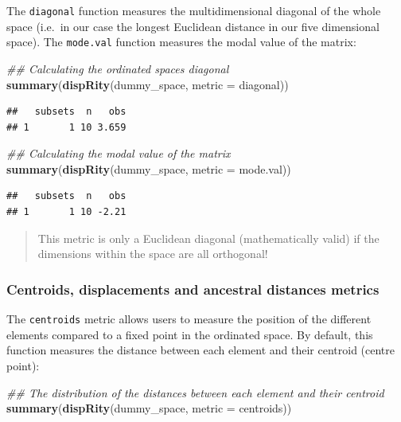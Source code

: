 \documentclass[
]{book}
\newenvironment{Shaded}{\begin{snugshade}}{\end{snugshade}}
\newcommand{\CommentTok}[1]{\textcolor[rgb]{0.56,0.35,0.01}{\textit{#1}}}
\newcommand{\DataTypeTok}[1]{\textcolor[rgb]{0.13,0.29,0.53}{#1}}
\newcommand{\KeywordTok}[1]{\textcolor[rgb]{0.13,0.29,0.53}{\textbf{#1}}}
\newcommand{\NormalTok}[1]{#1}
\begin{document}
The \texttt{diagonal} function measures the multidimensional diagonal of the whole space (i.e.~in our case the longest Euclidean distance in our five dimensional space).
The \texttt{mode.val} function measures the modal value of the matrix:

\begin{Shaded}
\begin{Highlighting}[]
\CommentTok{\#\# Calculating the ordinated space\textquotesingle{}s diagonal}
\KeywordTok{summary}\NormalTok{(}\KeywordTok{dispRity}\NormalTok{(dummy\_space, }\DataTypeTok{metric =}\NormalTok{ diagonal))}
\end{Highlighting}
\end{Shaded}

\begin{verbatim}
##   subsets  n   obs
## 1       1 10 3.659
\end{verbatim}

\begin{Shaded}
\begin{Highlighting}[]
\CommentTok{\#\# Calculating the modal value of the matrix}
\KeywordTok{summary}\NormalTok{(}\KeywordTok{dispRity}\NormalTok{(dummy\_space, }\DataTypeTok{metric =}\NormalTok{ mode.val))}
\end{Highlighting}
\end{Shaded}

\begin{verbatim}
##   subsets  n   obs
## 1       1 10 -2.21
\end{verbatim}

\begin{quote}
This metric is only a Euclidean diagonal (mathematically valid) if the dimensions within the space are all orthogonal!
\end{quote}

\hypertarget{centroids}{%
\subsubsection{Centroids, displacements and ancestral distances metrics}\label{centroids}}

The \texttt{centroids} metric allows users to measure the position of the different elements compared to a fixed point in the ordinated space.
By default, this function measures the distance between each element and their centroid (centre point):

\begin{Shaded}
\begin{Highlighting}[]
\CommentTok{\#\# The distribution of the distances between each element and their centroid}
\KeywordTok{summary}\NormalTok{(}\KeywordTok{dispRity}\NormalTok{(dummy\_space, }\DataTypeTok{metric =}\NormalTok{ centroids))}
\end{Highlighting}
\end{Shaded}
\end{document}
